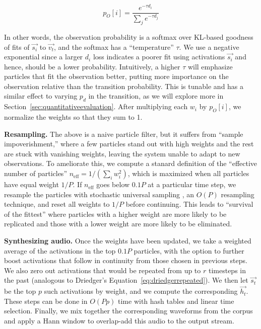 \documentclass{article}
\begin{document}
\begin{equation}
    \label{eq:observationprob}
    p_O[i] = \frac{e^{-\tau d_i}}{ \sum_{j} e^{-\tau d_j}}
\end{equation}

In other words, the observation probability is a softmax over KL-based goodness of fits of $\vec{s_i}$ to $\vec{v_t}$, and the softmax has a ``temperature'' $\tau$.  We use a negative exponential since a larger $d_i$ loss indicates a poorer fit using activations $\vec{s_i}$ and hence, should be a lower probability.  Intuitively, a higher $\tau$ will emphasize particles that fit the observation better, putting more importance on the observation relative than the transition probability.  This is tunable and has a similar effect to varying $p_d$ in the transition, as we will explore more in Section~\ref{sec:quantitativeevaluation}.  After multiplying each $w_i$ by $p_O[i]$, we normalize the weights so that they sum to 1.  

\textbf{Resampling.} The above is a naive particle filter, but it suffers from ``sample impoverishment,'' where a few particles stand out with high weights and the rest are stuck with vanishing weights, leaving the system unable to adapt to new observations.  To ameliorate this, we compute a stanard definition of the ``effective number of particles'' $n_{\text{eff}} = 1/(\sum_{i} w_i^2)$, which is maximized when all particles have equal weight $1/P$.  If $n_{\text{eff}}$ goes below $0.1P$ at a particular time step, we resample the particles with stochastic universal sampling \cite{kitagawa1996monte, carpenter1999improved}, an $O(P)$ resampling technique, and reset all weights to $1/P$ before continuing.  This leads to ``survival of the fittest'' where particles with a higher weight are more likely to be replicated and those with a lower weight are more likely to be eliminated.

\textbf{Synthesizing audio.} Once the weights have been updated, we take a weighted average of the activations in the top $0.1P$ particles, with the option to further boost activations that follow in continuity from those chosen in previous steps.  We also zero out activations that would be repeated from up to $r$ timesteps in the past (analogous to Driedger's Equation~\ref{eq:driedgerrepeated}).  We then let $\vec{s_t}$ be the top $p$ such activations by weight, and we compute the corresponding $\vec{h_t}$. These steps can be done in $O(Pp)$ time with hash tables and linear time selection.  Finally, we mix together the corresponding waveforms from the corpus and apply a Hann window to overlap-add this audio to the output stream.
\end{document}
